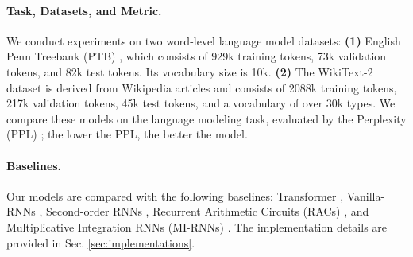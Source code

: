 \paragraph{Task, Datasets, and Metric.}  We conduct experiments on two word-level language model datasets: \textbf{(1)} English Penn Treebank (PTB) \citep{marcinkiewicz1994building}, which consists of 929k training tokens, 73k validation tokens, and 82k test tokens. Its vocabulary size is 10k. \textbf{(2)} The WikiText-2 dataset \citep{merity2016pointer} is derived from Wikipedia articles and consists of 2088k training tokens, 217k validation tokens, 45k test tokens, and a vocabulary of over 30k types. We compare these models on the language modeling task,  evaluated by the Perplexity (PPL) \citep{meister-cotterell-2021-language}; the lower the PPL, the better the model.


\paragraph{Baselines.} Our models are compared with the following baselines: 
  Transformer \citep{vaswani2017attention} ,  Vanilla-RNNs \citep{mikolov2012context},     Second-order RNNs \citep{hochreiter1997long}, Recurrent Arithmetic Circuits (RACs)   \citep{levine2018benefits}, and   Multiplicative Integration RNNs (MI-RNNs) \citep{wu_multiplicative_2016}. The implementation details are provided in Sec. \ref{sec:implementations}.






